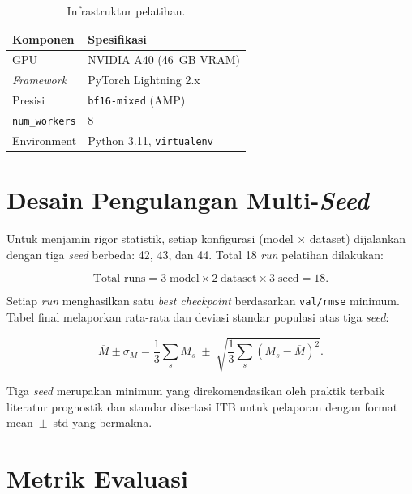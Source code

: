 \begin{table}[ht]
\centering
\caption{Infrastruktur pelatihan.}
\label{tab:bab4_infra}
\small
\begin{tabular}{@{}ll@{}}
\toprule
\textbf{Komponen} & \textbf{Spesifikasi} \\
\midrule
GPU             & NVIDIA A40 (46~GB VRAM) \\
\emph{Framework} & PyTorch Lightning 2.x \\
Presisi         & \texttt{bf16-mixed} (AMP) \\
\texttt{num\_workers} & 8 \\
Environment     & Python 3.11, \texttt{virtualenv} \\
\bottomrule
\end{tabular}
\end{table}

\section{Desain Pengulangan Multi-\emph{Seed}}
\label{sec:bab4_multiseed}

Untuk menjamin rigor statistik, setiap konfigurasi (model × dataset)
dijalankan dengan tiga \emph{seed} berbeda: 42, 43, dan 44.
Total 18 \emph{run} pelatihan dilakukan:

\begin{equation}\label{eq:bab4_totalruns}
\text{Total runs} = 3 \;\text{model} \times 2 \;\text{dataset} \times 3 \;\text{seed} = 18.
\end{equation}

Setiap \emph{run} menghasilkan satu \emph{best checkpoint} berdasarkan
\texttt{val/rmse} minimum.
Tabel final melaporkan rata-rata dan deviasi standar populasi atas
tiga \emph{seed}:

\begin{equation}\label{eq:bab4_mean_std}
\overline{M} \pm \sigma_{M} = \frac{1}{3}\sum_{s}\!M_{s}
  \;\pm\; \sqrt{\frac{1}{3}\sum_{s}\!\left(M_{s} - \overline{M}\right)^{2}}.
\end{equation}

Tiga \emph{seed} merupakan minimum yang direkomendasikan oleh praktik
terbaik literatur prognostik dan standar disertasi ITB untuk
pelaporan dengan format mean~$\pm$~std yang bermakna.

\section{Metrik Evaluasi}
\label{sec:bab4_metrik}

